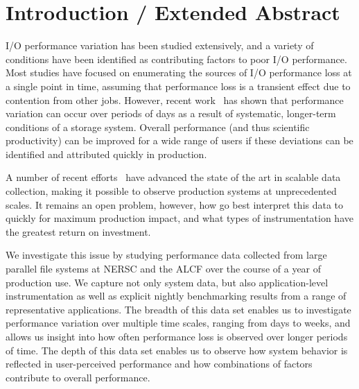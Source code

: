 \section{Introduction / Extended Abstract}

I/O performance variation has been studied extensively, and a variety of conditions have been identified as contributing factors to poor I/O performance.  Most studies have focused on enumerating the sources of I/O performance loss at a single point in time, assuming that performance loss is a transient effect due to contention from other jobs.  However, recent work~\cite{Lockwood2017} has shown that performance variation can occur over periods of days as a result of systematic, longer-term conditions of a storage system.
%
Overall performance (and thus scientific productivity) can be improved for a
wide range of users if these deviations can be identified and attributed
quickly in production.


A number of recent efforts~\cite{TODO:tokio,guide,ldms,siox} have advanced the
state of the art in scalable data collection, making it possible to observe
production systems at unprecedented scales.  It remains an open problem,
however, how go best interpret this data to quickly for maximum production
impact, and what types of instrumentation have the greatest return on
investment.

We investigate this issue by studying performance data collected from
large parallel file systems at NERSC and the ALCF over the course of
a year of production use.  We capture not only system data, but also
application-level instrumentation as well as explicit nightly benchmarking
results from a range of representative applications.  The breadth of
this data set enables us to investigate performance variation over
multiple time scales, ranging from days to weeks, and allows us insight
into how often performance loss is observed over longer periods of time.
The depth of this data set enables us to observe how system behavior is
reflected in user-perceived performance and how combinations of factors
contribute to overall performance.


